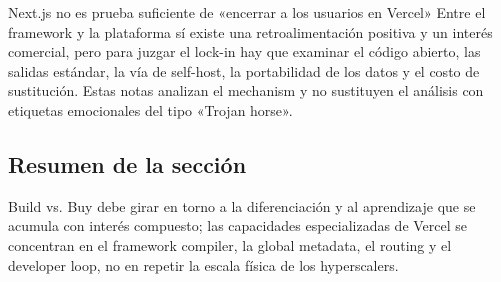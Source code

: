 \begin{warningbox}{Next.js no es prueba suficiente de «encerrar a los usuarios en Vercel»}
Entre el framework y la plataforma sí existe una retroalimentación positiva y un interés comercial, pero para juzgar el lock-in hay que examinar el código abierto, las salidas estándar, la vía de self-host, la portabilidad de los datos y el costo de sustitución. Estas notas analizan el mechanism y no sustituyen el análisis con etiquetas emocionales del tipo «Trojan horse».
\end{warningbox}


\subsection{Resumen de la sección}

Build vs. Buy debe girar en torno a la diferenciación y al aprendizaje que se acumula con interés compuesto; las capacidades especializadas de Vercel se concentran en el framework compiler, la global metadata, el routing y el developer loop, no en repetir la escala física de los hyperscalers.
